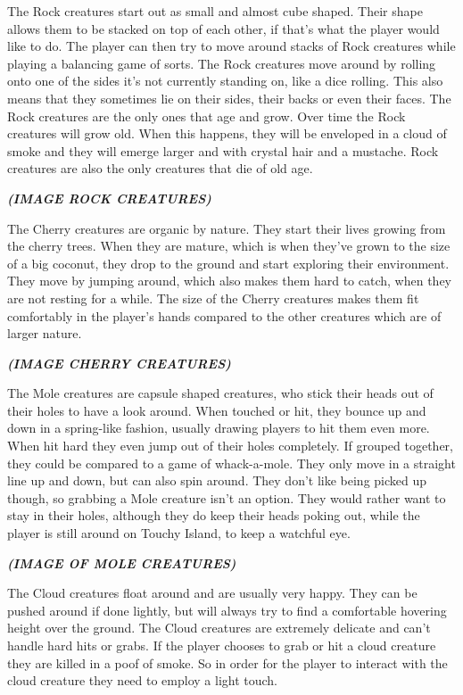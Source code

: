 The Rock creatures start out as small and almost cube shaped. Their shape allows them to be stacked on top of each other, if that's what the player would like to do. The player can then try to move around stacks of Rock creatures while playing a balancing game of sorts. The Rock creatures move around by rolling onto one of the sides it's not currently standing on, like a dice rolling. This also means that they sometimes lie on their sides, their backs or even their faces. The Rock creatures are the only ones that age and grow. Over time the Rock creatures will grow old. When this happens, they will be enveloped in a cloud of smoke and they will emerge larger and with crystal hair and a mustache. Rock creatures are also the only creatures that die of old age.

\textbf{\textit{(IMAGE ROCK CREATURES)}}

The Cherry creatures are organic by nature. They start their lives growing from the cherry trees. When they are mature, which is when they've grown to the size of a big coconut, they drop to the ground and start exploring their environment. They move by jumping around, which also makes them hard to catch, when they are not resting for a while. The size of the Cherry creatures makes them fit comfortably in the player's hands compared to the other creatures which are of larger nature.

\textbf{\textit{(IMAGE CHERRY CREATURES)}}

The Mole creatures are capsule shaped creatures, who stick their heads out of their holes to have a look around. When touched or hit, they bounce up and down in a spring-like fashion, usually drawing players to hit them even more. When hit hard they even jump out of their holes completely. If grouped together, they could be compared to a game of whack-a-mole.  They only move in a straight line up and down, but can also spin around. They don't like being picked up though, so grabbing a Mole creature isn't an option. They would rather want to stay in their holes, although they do keep their heads poking out, while the player is still around on Touchy Island, to keep a watchful eye.

\textbf{\textit{(IMAGE OF MOLE CREATURES)}}

The Cloud creatures float around and are usually very happy. They can be pushed around if done lightly, but will always try to find a comfortable hovering height over the ground. The Cloud creatures are extremely delicate and can't handle hard hits or grabs. If the player chooses to grab or hit a cloud creature they are killed in a poof of smoke. So in order for the player to interact with the cloud creature they need to employ a light touch.


